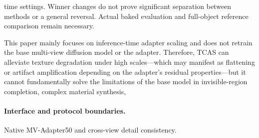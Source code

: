 \documentclass[times,twocolumn,final]{elsarticle}
\providecommand{\DIFadd}[1]{{\protect\color{blue} \sf #1}} %
\providecommand{\DIFdel}[1]{{\protect\color{red} \scriptsize #1}} %
\providecommand{\DIFaddbegin}{} %
\providecommand{\DIFaddend}{} %
\providecommand{\DIFdelbegin}{} %
\providecommand{\DIFdelend}{} %
\begin{document}

\DIFdelend \DIFaddbegin \DIFadd{time settings. Winner changes do not prove significant separation between methods or a general reversal. Actual baked evaluation and full-object reference comparison remain necessary.
}\DIFaddend 

\DIFdelbegin \DIFdel{This paper mainly focuses on inference-time adapter scaling and does not retrain the base multi-view diffusion model or the adapter.
Therefore, TCAS can alleviate texture degradation under high scales---which may manifest as flattening or artifact amplification depending on the adapter's residual properties---but it cannot fundamentally solve the limitations of the base model in invisible-region completion, complex material synthesis, }\DIFdelend \DIFaddbegin \paragraph{Interface and protocol boundaries.}
\DIFadd{Native MV-Adapter50 }\DIFaddend and \DIFdelbegin \DIFdel{cross-view detail consistency. }%
\end{document}

